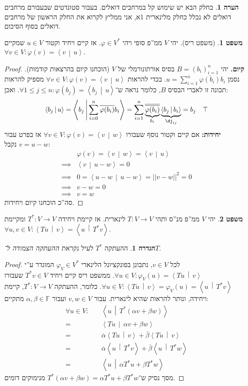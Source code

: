 \documentclass[a4paper]{article}
\newcommand\vphi  {\varphi}
\newcommand\ra    {\rangle}
\newcommand\la    {\langle}
\newcommand\ol    {\overline}
\newcommand\sumni     {\sum_{i = 0}^{n}}
\newcommand\F         {\mathbb{F}}
\newcommand\co        {\colon}
\newcommand\norm[1]   {\left \vert \left \vert #1 \right \vert \right \vert}
\newcommand\mut [2]   {\left \la #1 \,\middle\vert\, #2 \right \ra}
\newcommand\ag        {\alpha}
\newcommand\bg        {\beta}
\renewcommand\phi     {\varphi}
\theoremstyle{definition}
\newtheorem{Theorem}{משפט}
\newtheorem{definition}{הגדרה}
\newtheorem{Remark}{הערה}
\newcommand\theo  [1] {\begin{Theorem}#1\end{Theorem}}
\newcommand\defi  [1] {\begin{definition}#1\end{definition}}
\newcommand\rmark [1] {\begin{Remark}#1\end{Remark}}
\begin{document}
	\rmark{בחלק הבא יש שימוש קל במרחבים דואלים. בעבור סטונדטים שבעבורם מרחבים דואלים לא נכלל כחלק מלינארית 1א, אני ממליץ לקרוא את החלק הראשון של מרחבים דואלים בסוף הסיכום. }
	
	
	\theo{(משפט ריס). יהי $V$ ממ''פ סופי ויהי $\vphi \in V^*$. אז קיים ויחיד וקטור $u \in V$ שמקיים $\forall v \in V \co \vphi(v) = \mut{v}{u}$. }\begin{proof}
		\textbf{קיום. }יהי $B = (b_i)_{i = 1}^{n}$ בסיס אורתונורמלי של $V$ (הוכחנו קיום בהרצאות קודמות). נסמן $u = \sum_{i =1}^{n}\ol{\phi(b_i)} b_i$. בכדי להראות $\forall v \in V \co \phi(v) = \mut{v}{u}$ מספיק להראות תכונה זו לאברי הבסיס $B$, כלומר נראה ש־$\forall 1 \le j \le n \co \phi(b_j) = \mut{b_j}{u}$. ואכן: 
		\[ \mut{b_j}{u} = \mut{b_j}{\sumni \ol{\phi(b_i)}b_i} = \sum_{i = 1}^{n}\underbrace{\ol{\ol{\phi(b_i)}}}_{b_i}\underbrace{\mut{b_j}{b_i}}_{\dj_{ij}} = b_j \quad \top \]
		\textbf{יחידות: }אם קיים וקטור נוסף שעבורו $\forall v \in V \co \phi(v) = \mut{v}{w}$ אז בפרט עבור $v = u - w$ נקבל: 
		\begin{align*}
			         &\phi(v) = \mut{v}{w} = \mut{v}{u} \\
			\implies &\mut{v}{u - w} = 0 \\ 
			\implies &0 = \mut{u - w}{u - w} = \norm{v - w}^{2} = 0 \\ 
			\implies &v - w = 0 \\
			\implies &v = w
		\end{align*}
		סה''כ הוכחנו קיום ויחידות. 
	\end{proof}
	
	\theo{יהי $V$ ממ''פ מנ''ס ותהי $T \co V \to V$ לינארית. אז קיימת ויחידה $T^* \co V \to V$ ומקיימת $\forall u ,v \in V \co \mut{Tu}{v} = \mut{u}{T^*v}$. }
	\defi{ההעתקה $T^*$ לעיל נקראת \textit{ההעתקה הצמודה ל־$T$}. }
	\begin{proof}
		לכל $v \in V$, נתבונן בפונקציונל הלינארי $\phi_V \in V^*$ המוגדר ע''י $\forall u \in V \co \phi_V(u) = \mut{Tu}{v}$. ממשפט ריס קיים ויחיד $T^*v \in V$ שעבורו $\forall u \in V \co \mut{Tu}{v} = \phi_V(u) = \mut{u}{T^*v}$. כלומר, ההעתקה $T^* \co V \to V$, קיימת ויחידה, ונותר להראות שהיא לינארית. עבור $v, w \in V$ ועבור $\ag, \bg \in \F$ מתקיים: 
		\begin{align*}
			\forall u \in V \co \quad & \mut{u}{T^* (\ag v + \bg w)} \\
			= &\mut{Tu}{\ag v + \bg w} \\
			= &\bar \ag \mut{Tu}{v} + \bar \bg \mut{Tu}{v} \\ 
			= &\bar \ag \mut{u}{T^* v} + \bar \bg \mut{u}{T^*w} \\
			= &\mut{u}{\ag T^*u + \bg T^*w}
		\end{align*}
		מסך נסיק ש־$T^*(\ag v + \bg w) = \ag T^* u + \bg T^* w$ מנימוקים דומים. 
	\end{proof}
	
\end{document}

